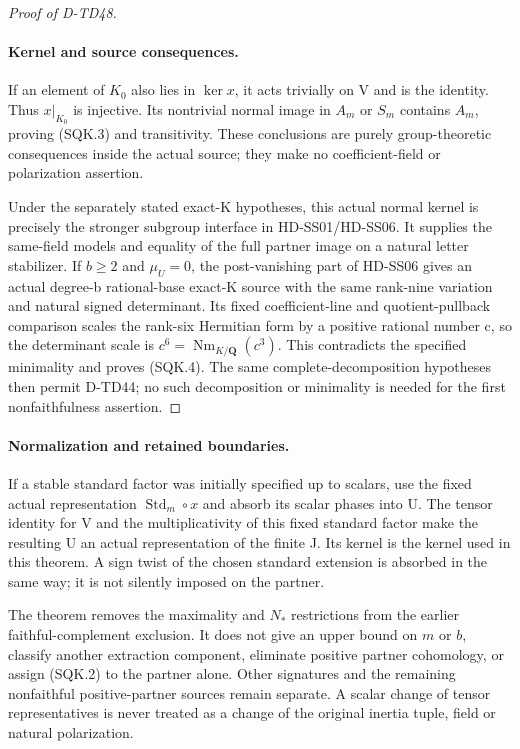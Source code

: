 \begin{proof}[Proof of D-TD48]
\paragraph{Kernel and source consequences.}
If an element of \(K_0\) also lies in \(\ker x\), it
acts trivially on V and is the identity.  Thus
\(x|_{K_0}\) is injective.  Its nontrivial normal image
in \(A_m\) or \(S_m\) contains \(A_m\), proving
(SQK.3) and transitivity.  These conclusions are purely
group-theoretic consequences inside the actual source;
they make no coefficient-field or polarization assertion.

Under the separately stated exact-K hypotheses, this
actual normal kernel is precisely the stronger subgroup
interface in HD-SS01/HD-SS06.  It supplies the same-field
models and equality of the full partner image on a
natural letter stabilizer.  If \(b\ge2\) and \(\mu_U=0\),
the post-vanishing part of HD-SS06 gives an actual
degree-b rational-base exact-K source with the same
rank-nine variation and natural signed determinant.
Its fixed coefficient-line and quotient-pullback comparison
scales the rank-six Hermitian form by a positive rational
number c, so the determinant scale is
\(c^6=\operatorname{Nm}_{K/\mathbf Q}(c^3)\).
This contradicts the specified minimality and proves
(SQK.4).  The same complete-decomposition hypotheses then
permit D-TD44; no such decomposition or minimality is
needed for the first nonfaithfulness assertion.
\end{proof}

\paragraph{Normalization and retained boundaries.}
If a stable standard factor was initially specified up to
scalars, use the fixed actual representation
\(\operatorname{Std}_m\circ x\) and absorb its scalar
phases into U.  The tensor identity for V and the
multiplicativity of this fixed standard factor make
the resulting U an actual representation of the finite J.
Its kernel is the kernel used in this theorem.  A sign
twist of the chosen standard extension is absorbed in
the same way; it is not silently imposed on the partner.

The theorem removes the maximality and \(N_*\) restrictions
from the earlier faithful-complement exclusion.  It does
not give an upper bound on \(m\) or \(b\), classify another
extraction component, eliminate positive partner cohomology,
or assign (SQK.2) to the partner alone.  Other signatures
and the remaining nonfaithful positive-partner sources
remain separate.  A scalar change of tensor representatives
is never treated as a change of the original inertia tuple,
field or natural polarization.
